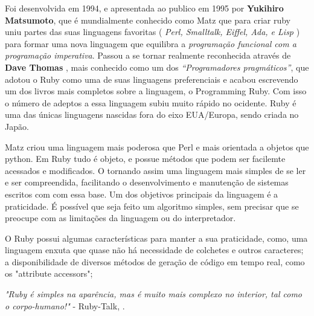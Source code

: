 Foi desenvolvida em 1994, e apresentada ao publico em 1995 por \textbf{Yukihiro Matsumoto}, que é mundialmente	conhecido como Matz que para criar ruby uniu partes das suas linguagens favoritas 
(\textit { Perl, Smalltalk, Eiffel, Ada, e Lisp }) para formar uma nova linguagem que equilibra a \textit{ programação funcional com a programação imperativa}. Passou a se tornar realmente reconhecida através de \textbf{ Dave Thomas }, mais conhecido como um dos \textit{“Programadores pragmáticos”}, que adotou o Ruby como uma de suas linguagens preferenciais e acabou escrevendo um dos livros mais completos sobre a linguagem, o Programming Ruby. Com isso	o número de adeptos a essa linguagem subiu muito rápido no ocidente. Ruby é uma das únicas linguagens nascidas fora do eixo EUA/Europa, sendo criada no Japão.

Matz criou uma linguagem mais poderosa que Perl e mais orientada a objetos que python. Em Ruby tudo é objeto, e possue métodos que podem ser facilemte acessados e modificados. O tornando assim uma linguagem mais simples de se ler e ser compreendida, facilitando o desenvolvimento e manutenção de sistemas escritos com com essa base. Um dos objetivos principais da linguagem é a praticidade. É possível que seja feito um algoritmo simples, sem precisar que se preocupe com as limitações da linguagem ou do interpretador.

O Ruby possui algumas características para manter a sua praticidade, como, uma linguagem enxuta que quase não há necessidade de colchetes e outros caracteres; a disponibilidade de diversos métodos de geração de código em tempo real, como os "attribute accessors";

\begin{center}
  \textit{"Ruby é simples na aparência, mas é muito mais complexo no interior, tal como o corpo-humano!"} - Ruby-Talk, \cite{MATZ}.
\end{center}


